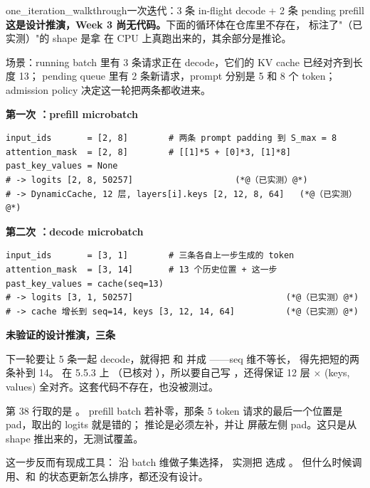 \begin{examplebox}{one_iteration_walkthrough}{一次迭代：3 条 in-flight decode + 2 条 pending prefill}
\textbf{这是设计推演，Week 3 尚无代码。}下面的循环体在仓库里不存在，
标注了"（已实测）"的 shape 是拿  在 CPU 上真跑出来的，其余部分是推论。

场景：running batch 里有 3 条请求正在 decode，它们的 KV cache 已经对齐到长度 13；
pending queue 里有 2 条新请求，prompt 分别是 5 和 8 个 token；
admission policy 决定这一轮把两条都收进来。

\medskip
\textbf{第一次 ：prefill microbatch}

\begin{lstlisting}[style=hlplain]
input_ids       = [2, 8]        # 两条 prompt padding 到 S_max = 8
attention_mask  = [2, 8]        # [[1]*5 + [0]*3, [1]*8]
past_key_values = None
# -> logits [2, 8, 50257]                    (*@（已实测）@*)
# -> DynamicCache, 12 层, layers[i].keys [2, 12, 8, 64]   (*@（已实测）@*)
\end{lstlisting}

\textbf{第二次 ：decode microbatch}

\begin{lstlisting}[style=hlplain]
input_ids       = [3, 1]        # 三条各自上一步生成的 token
attention_mask  = [3, 14]       # 13 个历史位置 + 这一步
past_key_values = cache(seq=13)
# -> logits [3, 1, 50257]                              (*@（已实测）@*)
# -> cache 增长到 seq=14, keys [3, 12, 14, 64]          (*@（已实测）@*)
\end{lstlisting}

\medskip
\textbf{未验证的设计推演，三条}

下一轮要让 5 条一起 decode，就得把
\code{[2, 12, 8, 64]} 和 \code{[3, 12, 14, 64]} 并成 \code{[5, 12, 14, 64]}——seq 维不等长，
得先把短的两条补到 14。 在 5.5.3 上
（已核对 ），所以要自己写 ，还得保证 12 层
$\times$ (keys, values) 全对齐。这套代码不存在，也没被测过。

 第 38 行取的是 。
prefill batch 若补零，那条 5 token 请求的最后一个位置是 pad，取出的 logits 就是错的；
推论是必须左补，并让  屏蔽左侧 pad。这只是从 shape 推出来的，无测试覆盖。

这一步反而有现成工具：
 沿 batch 维做子集选择，
实测把 \code{[3, 12, 14, 64]} 选成 \code{[2, 12, 14, 64]}。
但什么时候调用、和  的状态更新怎么排序，都还没有设计。
\end{examplebox}

